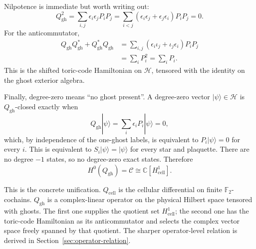 Nilpotence is immediate but worth writing out:
\[
  Q_{\mathrm{gh}}^2
  =\sum_{i,j}\epsilon_i\epsilon_jP_iP_j
  =\sum_{i<j}(\epsilon_i\epsilon_j+\epsilon_j\epsilon_i)P_iP_j=0.
\]
For the anticommutator,
\[
\begin{aligned}
  Q_{\mathrm{gh}}Q_{\mathrm{gh}}^*
  +Q_{\mathrm{gh}}^*Q_{\mathrm{gh}}
  &=
  \sum_{i,j}(\epsilon_i\iota_j+\iota_j\epsilon_i)P_iP_j  \\
  &=\sum_i P_i^2
  =\sum_i P_i .
\end{aligned}
\]
This is the shifted toric-code Hamiltonian on \(\mathcal H\), tensored with the
identity on the ghost exterior algebra.

Finally, degree-zero means ``no ghost present''. A degree-zero vector
\(|\psi\rangle\in\mathcal H\) is \(Q_{\mathrm{gh}}\)-closed exactly when
\[
  Q_{\mathrm{gh}}|\psi\rangle
  =\sum_i \epsilon_iP_i|\psi\rangle=0,
\]
which, by independence of the one-ghost labels, is equivalent to
\(P_i|\psi\rangle=0\) for every \(i\). This is equivalent to
\(S_i|\psi\rangle=|\psi\rangle\) for every star and plaquette. There are no
degree \(-1\) states, so no degree-zero exact states. Therefore
\[
  H^0(Q_{\mathrm{gh}})=\mathcal C
  \cong \mathbb C[H^1_{\mathrm{cell}}].
\]

This is the concrete unification. \(Q_{\mathrm{cell}}\) is the cellular
differential on finite \(\mathbb F_2\)-cochains. \(Q_{\mathrm{gh}}\) is a
complex-linear operator on the physical Hilbert space tensored with ghosts. The
first one supplies the quotient set \(H^1_{\mathrm{cell}}\); the second one has
the toric-code Hamiltonian as its anticommutator and selects the complex vector
space freely spanned by that quotient. The sharper operator-level relation is
derived in Section~\ref{sec:operator-relation}.
